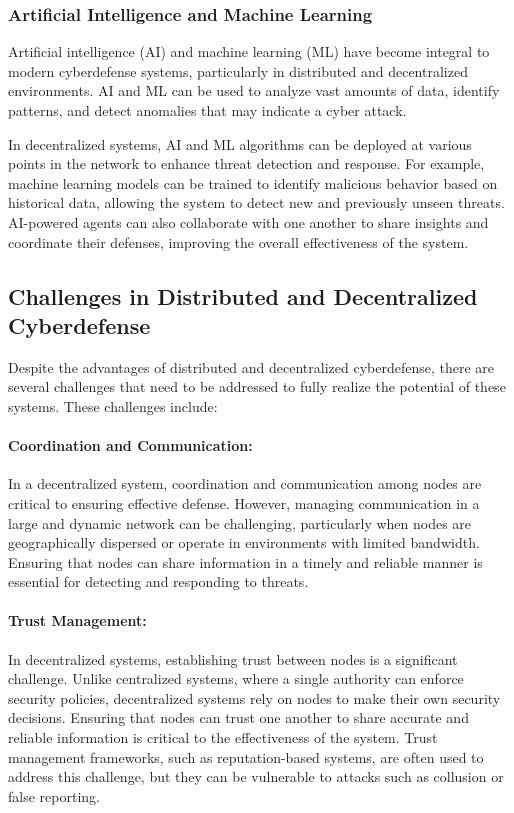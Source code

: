 \subsubsection{Artificial Intelligence and Machine Learning}

Artificial intelligence (AI) and machine learning (ML) have become integral to modern cyberdefense systems, particularly in distributed and decentralized environments. AI and ML can be used to analyze vast amounts of data, identify patterns, and detect anomalies that may indicate a cyber attack.

In decentralized systems, AI and ML algorithms can be deployed at various points in the network to enhance threat detection and response. For example, machine learning models can be trained to identify malicious behavior based on historical data, allowing the system to detect new and previously unseen threats. AI-powered agents can also collaborate with one another to share insights and coordinate their defenses, improving the overall effectiveness of the system.

\subsection{Challenges in Distributed and Decentralized Cyberdefense}

Despite the advantages of distributed and decentralized cyberdefense, there are several challenges that need to be addressed to fully realize the potential of these systems. These challenges include:

\paragraph{Coordination and Communication:}
In a decentralized system, coordination and communication among nodes are critical to ensuring effective defense. However, managing communication in a large and dynamic network can be challenging, particularly when nodes are geographically dispersed or operate in environments with limited bandwidth. Ensuring that nodes can share information in a timely and reliable manner is essential for detecting and responding to threats.

\paragraph{Trust Management:}
In decentralized systems, establishing trust between nodes is a significant challenge. Unlike centralized systems, where a single authority can enforce security policies, decentralized systems rely on nodes to make their own security decisions. Ensuring that nodes can trust one another to share accurate and reliable information is critical to the effectiveness of the system. Trust management frameworks, such as reputation-based systems, are often used to address this challenge, but they can be vulnerable to attacks such as collusion or false reporting.

